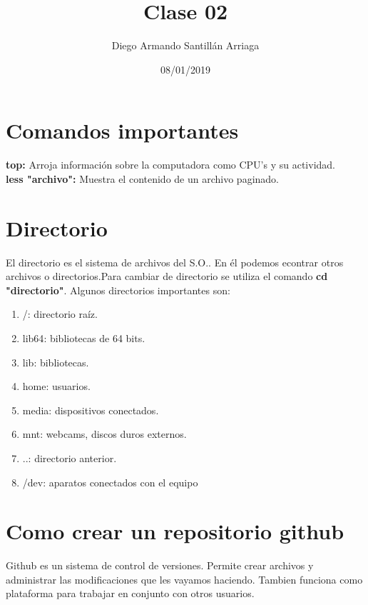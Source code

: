 \documentclass[letter paper, 12pt, oneside]{article}
\title{\Huge Clase 02}
\author{Diego Armando Santillán Arriaga}
\date{08/01/2019}
\begin{document}
	\maketitle
\newpage
\section{Comandos importantes}
\textbf{top:} Arroja información sobre la computadora como CPU's y su actividad.
\\
\textbf{less "archivo":} Muestra el contenido de un archivo paginado.


\section{Directorio}


El directorio es el sistema de archivos del S.O.. En él podemos econtrar otros archivos o directorios.Para cambiar de directorio se utiliza el comando \textbf{cd "directorio"}. Algunos directorios importantes son:
\begin{enumerate}
\item{/}: directorio raíz.


\item{lib64}: bibliotecas de 64 bits.


\item{lib}: bibliotecas.


\item{home}: usuarios.


\item{media}: dispositivos conectados.


\item{mnt}: webcams, discos duros externos.


\item{..}: directorio anterior.


\item{/dev}: aparatos conectados con el equipo

\end{enumerate}

\section{Como crear un repositorio github}


Github es un sistema de control de versiones. Permite crear archivos y administrar las modificaciones que les vayamos haciendo. Tambien funciona como plataforma para trabajar en conjunto con otros usuarios.
\end{document}
